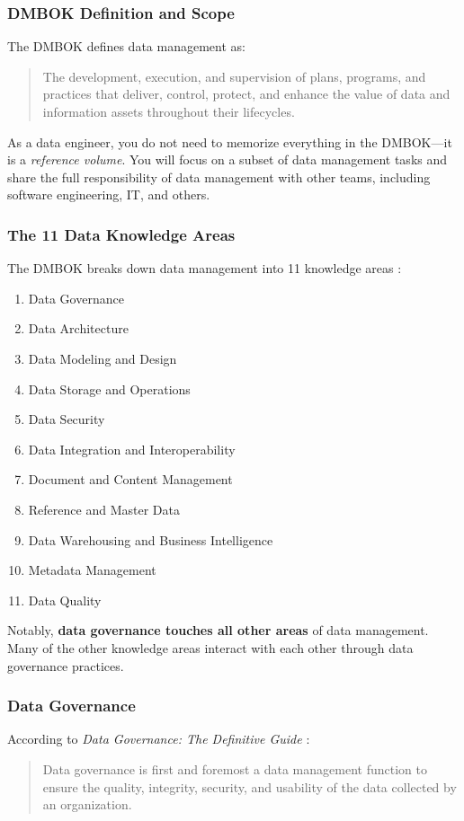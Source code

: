 \documentclass{article}
\begin{document}
\subsubsection{DMBOK Definition and Scope}
The DMBOK defines data management as:
\begin{quote}
    The development, execution, and supervision of plans, programs, and practices that deliver, control, protect, and enhance the value of data and information assets throughout their lifecycles.
\end{quote}

As a data engineer, you do not need to memorize everything in the DMBOK---it is a \textit{reference volume}. You will focus on a subset of data management tasks and share the full responsibility of data management with other teams, including software engineering, IT, and others.

\subsubsection{The 11 Data Knowledge Areas}
The DMBOK breaks down data management into 11 knowledge areas \cite{dama2017dmbok}:
\begin{enumerate}
    \item Data Governance
    \item Data Architecture
    \item Data Modeling and Design
    \item Data Storage and Operations
    \item Data Security
    \item Data Integration and Interoperability
    \item Document and Content Management
    \item Reference and Master Data
    \item Data Warehousing and Business Intelligence
    \item Metadata Management
    \item Data Quality
\end{enumerate}

Notably, \textbf{data governance touches all other areas} of data management. Many of the other knowledge areas interact with each other through data governance practices.

\subsubsection{Data Governance}
According to \textit{Data Governance: The Definitive Guide} \cite{ladley2019governance}:
\begin{quote}
    Data governance is first and foremost a data management function to ensure the quality, integrity, security, and usability of the data collected by an organization.
\end{quote}
\end{document}

